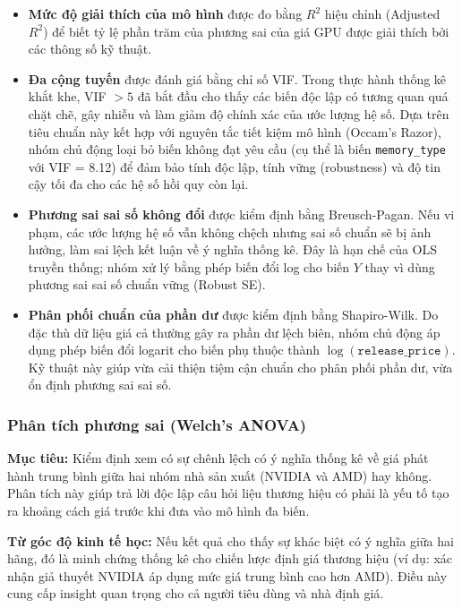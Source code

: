 \documentclass[12pt,a4paper]{article}
\begin{document}
\begin{itemize}[leftmargin=1.5em]
  \item \textbf{Mức độ giải thích của mô hình} được đo bằng $R^2$ hiệu chỉnh (Adjusted
        $R^2$) để biết tỷ lệ phần trăm của phương sai của giá GPU được giải thích bởi các
        thông số kỹ thuật.

  \item \textbf{Đa cộng tuyến} được đánh giá bằng chỉ số VIF. Trong thực hành thống kê
        khắt khe, VIF $> 5$ đã bắt đầu cho thấy các biến độc lập có tương quan quá chặt
        chẽ, gây nhiễu và làm giảm độ chính xác của ước lượng hệ số. Dựa trên tiêu chuẩn
        này kết hợp với nguyên tắc tiết kiệm mô hình (Occam's Razor), nhóm chủ động loại
        bỏ biến không đạt yêu cầu (cụ thể là biến \texttt{memory\_type} với VIF = 8.12)
        để đảm bảo tính độc lập, tính vững (robustness) và độ tin cậy tối đa cho các hệ
        số hồi quy còn lại.

  \item \textbf{Phương sai sai số không đổi} được kiểm định bằng Breusch-Pagan. Nếu vi
        phạm, các ước lượng hệ số vẫn không chệch nhưng sai số chuẩn sẽ bị ảnh hưởng,
        làm sai lệch kết luận về ý nghĩa thống kê. Đây là hạn chế của OLS truyền thống;
        nhóm xử lý bằng phép biến đổi log cho biến $Y$ thay vì dùng phương sai sai số
        chuẩn vững (Robust SE).

  \item \textbf{Phân phối chuẩn của phần dư} được kiểm định bằng Shapiro-Wilk. Do đặc
        thù dữ liệu giá cả thường gây ra phần dư lệch biên, nhóm chủ động áp dụng phép
        biến đổi logarit cho biến phụ thuộc thành $\log(\texttt{release\_price})$. Kỹ
        thuật này giúp vừa cải thiện tiệm cận chuẩn cho phân phối phần dư, vừa ổn định
        phương sai sai số.
\end{itemize}

\subsubsection{Phân tích phương sai (Welch's ANOVA)}

\textbf{Mục tiêu:} Kiểm định xem có sự chênh lệch có ý nghĩa thống kê về giá phát hành
trung bình giữa hai nhóm nhà sản xuất (NVIDIA và AMD) hay không. Phân tích này giúp trả
lời độc lập câu hỏi liệu thương hiệu có phải là yếu tố tạo ra khoảng cách giá trước khi
đưa vào mô hình đa biến.

\textbf{Từ góc độ kinh tế học:} Nếu kết quả cho thấy sự khác biệt có ý nghĩa giữa hai
hãng, đó là minh chứng thống kê cho chiến lược định giá thương hiệu (ví dụ: xác nhận giả
thuyết NVIDIA áp dụng mức giá trung bình cao hơn AMD). Điều này cung cấp insight quan
trọng cho cả người tiêu dùng và nhà định giá.
\end{document}
